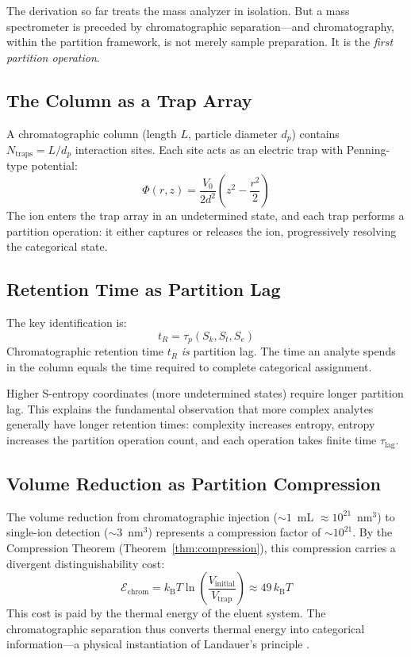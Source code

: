 \documentclass[twocolumn,10pt,a4paper]{article}
\theoremstyle{definition}
\theoremstyle{remark}
\newcommand{\kB}{k_{\mathrm{B}}}
\newcommand{\Cost}{\mathcal{E}}
\newcommand{\Lag}{\tau_{\mathrm{lag}}}
\newcommand{\taup}{\tau_p}
\begin{document}
The derivation so far treats the mass analyzer in isolation. But a mass spectrometer is preceded by chromatographic separation---and chromatography, within the partition framework, is not merely sample preparation. It is the \emph{first partition operation}.

\subsection{The Column as a Trap Array}

A chromatographic column (length $L$, particle diameter $d_p$) contains $N_{\text{traps}} = L/d_p$ interaction sites. Each site acts as an electric trap with Penning-type potential:
\begin{equation}
    \Phi(r, z) = \frac{V_0}{2d^2}\left(z^2 - \frac{r^2}{2}\right)
    \label{eq:penning}
\end{equation}
The ion enters the trap array in an undetermined state, and each trap performs a partition operation: it either captures or releases the ion, progressively resolving the categorical state.

\subsection{Retention Time as Partition Lag}

The key identification is:
\begin{equation}
    \boxed{t_R = \taup(S_k, S_t, S_e)}
    \label{eq:retention}
\end{equation}
Chromatographic retention time $t_R$ \emph{is} partition lag. The time an analyte spends in the column equals the time required to complete categorical assignment.

Higher S-entropy coordinates (more undetermined states) require longer partition lag. This explains the fundamental observation that more complex analytes generally have longer retention times: complexity increases entropy, entropy increases the partition operation count, and each operation takes finite time $\Lag$.

\subsection{Volume Reduction as Partition Compression}

The volume reduction from chromatographic injection ($\sim 1$~mL $\approx 10^{21}$~nm$^3$) to single-ion detection ($\sim 3$~nm$^3$) represents a compression factor of $\sim 10^{21}$. By the Compression Theorem (Theorem~\ref{thm:compression}), this compression carries a divergent distinguishability cost:
\begin{equation}
    \Cost_{\text{chrom}} = \kB T \ln\left(\frac{V_{\text{initial}}}{V_{\text{trap}}}\right) \approx 49\, \kB T
\end{equation}
This cost is paid by the thermal energy of the eluent system. The chromatographic separation thus converts thermal energy into categorical information---a physical instantiation of Landauer's principle \citep{landauer1961}.
\end{document}
